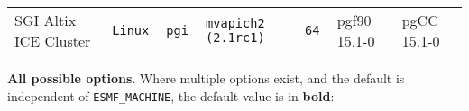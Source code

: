 \begin{longtable}{lllllll}
SGI Altix ICE Cluster &\tt Linux  &\tt pgi          &\tt mvapich2 (2.1rc1)&\tt 64           & pgf90 \footnotesize 15.1-0          & pgCC \footnotesize 15.1-0       \\ %
\end{longtable}

\vspace{1ex}

{\bf All possible options}. Where multiple options exist, and the default is independent
of {\tt ESMF\_MACHINE}, the default value is in {\bf bold}:

\vspace{1ex}


